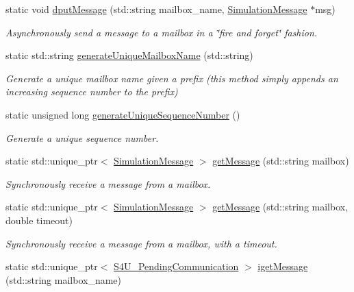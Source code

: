 \begin{DoxyCompactItemize}
\item 
static void \hyperlink{classwrench_1_1_s4_u___mailbox_a8104a8751389d6e61f8fec07bcc15034}{dput\+Message} (std\+::string mailbox\+\_\+name, \hyperlink{classwrench_1_1_simulation_message}{Simulation\+Message} $\ast$msg)
\begin{DoxyCompactList}\small\item\em Asynchronously send a message to a mailbox in a \char`\"{}fire and forget\char`\"{} fashion. \end{DoxyCompactList}\item 
static std\+::string \hyperlink{classwrench_1_1_s4_u___mailbox_a0724d933ea0b85b8242a411333c2acd1}{generate\+Unique\+Mailbox\+Name} (std\+::string)
\begin{DoxyCompactList}\small\item\em Generate a unique mailbox name given a prefix (this method simply appends an increasing sequence number to the prefix) \end{DoxyCompactList}\item 
static unsigned long \hyperlink{classwrench_1_1_s4_u___mailbox_a71ba39ec19960b3fca334836e19edb9f}{generate\+Unique\+Sequence\+Number} ()
\begin{DoxyCompactList}\small\item\em Generate a unique sequence number. \end{DoxyCompactList}\item 
static std\+::unique\+\_\+ptr$<$ \hyperlink{classwrench_1_1_simulation_message}{Simulation\+Message} $>$ \hyperlink{classwrench_1_1_s4_u___mailbox_add51ac46be430cd18ba395ea1aedfaa2}{get\+Message} (std\+::string mailbox)
\begin{DoxyCompactList}\small\item\em Synchronously receive a message from a mailbox. \end{DoxyCompactList}\item 
static std\+::unique\+\_\+ptr$<$ \hyperlink{classwrench_1_1_simulation_message}{Simulation\+Message} $>$ \hyperlink{classwrench_1_1_s4_u___mailbox_adf71050cad0d388b80ebde63f7fd76ae}{get\+Message} (std\+::string mailbox, double timeout)
\begin{DoxyCompactList}\small\item\em Synchronously receive a message from a mailbox, with a timeout. \end{DoxyCompactList}\item 
static std\+::unique\+\_\+ptr$<$ \hyperlink{classwrench_1_1_s4_u___pending_communication}{S4\+U\+\_\+\+Pending\+Communication} $>$ \hyperlink{classwrench_1_1_s4_u___mailbox_a3db23771a2e97e8740f67cdaf02ae3a1}{iget\+Message} (std\+::string mailbox\+\_\+name)

\end{DoxyCompactItemize}
